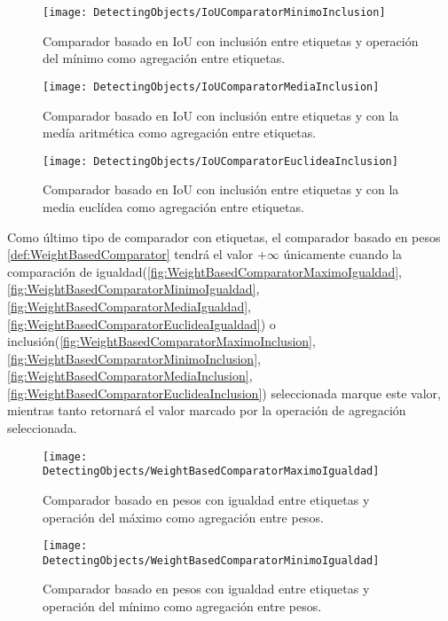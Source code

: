 \begin{figure}[htpb]
  \centering
  \texttt{[image: DetectingObjects/IoUComparatorMinimoInclusion]}
  \caption{Comparador basado en IoU con inclusión entre etiquetas y operación del mínimo como agregación entre etiquetas.}
  \label{fig:IoUComparatorMinimoInclusion}
\end{figure}

\begin{figure}[htpb]
  \centering
  \texttt{[image: DetectingObjects/IoUComparatorMediaInclusion]}
  \caption{Comparador basado en IoU con inclusión entre etiquetas y con la medía aritmética como agregación entre etiquetas.}
  \label{fig:IoUComparatorMediaInclusion}
\end{figure}

\begin{figure}[htpb]
  \centering
  \texttt{[image: DetectingObjects/IoUComparatorEuclideaInclusion]}
  \caption{Comparador basado en IoU con inclusión entre etiquetas y con la media euclídea como agregación entre etiquetas.}
  \label{fig:IoUComparatorEuclideaInclusion}
\end{figure}

\newpage
Como último tipo de comparador con etiquetas, el comparador basado en pesos \autoref{def:WeightBasedComparator} tendrá el valor $+\infty$ únicamente cuando la comparación de igualdad(\autoref{fig:WeightBasedComparatorMaximoIgualdad}, \autoref{fig:WeightBasedComparatorMinimoIgualdad}, \autoref{fig:WeightBasedComparatorMediaIgualdad}, \autoref{fig:WeightBasedComparatorEuclideaIgualdad}) o inclusión(\autoref{fig:WeightBasedComparatorMaximoInclusion}, \autoref{fig:WeightBasedComparatorMinimoInclusion}, \autoref{fig:WeightBasedComparatorMediaInclusion}, \autoref{fig:WeightBasedComparatorEuclideaInclusion}) seleccionada marque este valor, mientras tanto retornará el valor marcado por la operación de agregación seleccionada.\\

\begin{figure}[htpb]
  \centering
  \texttt{[image: DetectingObjects/WeightBasedComparatorMaximoIgualdad]}
  \caption{Comparador basado en pesos con igualdad entre etiquetas y operación del máximo como agregación entre pesos.}
  \label{fig:WeightBasedComparatorMaximoIgualdad}
\end{figure}

\begin{figure}[htpb]
  \centering
  \texttt{[image: DetectingObjects/WeightBasedComparatorMinimoIgualdad]}
  \caption{Comparador basado en pesos con igualdad entre etiquetas y operación del mínimo como agregación entre pesos.}
  \label{fig:WeightBasedComparatorMinimoIgualdad}
\end{figure}

